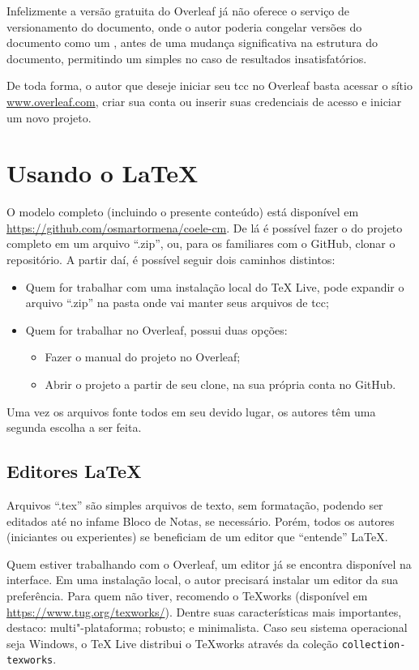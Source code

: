 Infelizmente a versão gratuita do Overleaf já não oferece o serviço de versionamento do documento, onde o autor poderia congelar versões do documento como um , antes de uma mudança significativa na estrutura do documento, permitindo um simples  no caso de resultados insatisfatórios.

De toda forma, o autor que deseje iniciar seu \ac{tcc} no Overleaf basta acessar o sítio \url{www.overleaf.com}, criar sua conta ou inserir suas credenciais de acesso e iniciar um novo projeto.

\section{Usando o \LaTeX}

O modelo completo (incluindo o presente conteúdo) está disponível em \url{https://github.com/osmartormena/coele-cm}. De lá é possível fazer o  do projeto completo em um arquivo \enquote{.zip}, ou, para os familiares com o GitHub, clonar o repositório. A partir daí, é possível seguir dois caminhos distintos:
\begin{itemize}
	\item Quem for trabalhar com uma instalação local do TeX Live, pode expandir o arquivo \enquote{.zip} na pasta onde vai manter seus arquivos de \ac{tcc};
	\item Quem for trabalhar no Overleaf, possui duas opções:
		\begin{itemize}
			\item Fazer o  manual do projeto no Overleaf;
			\item Abrir o projeto a partir de seu clone, na sua própria conta no GitHub.
		\end{itemize}
\end{itemize}

Uma vez os arquivos fonte todos em seu devido lugar, os autores têm uma segunda escolha a ser feita.

\subsection{Editores \LaTeX}

Arquivos \enquote{.tex} são simples arquivos de texto, sem formatação, podendo ser editados até no infame Bloco de Notas, se necessário. Porém, todos os autores (iniciantes ou experientes) se beneficiam de um editor que \enquote{entende} \LaTeX.

Quem estiver trabalhando com o Overleaf, um editor já se encontra disponível na interface. Em uma instalação local, o autor precisará instalar um editor da sua preferência. Para quem não tiver, recomendo o TeXworks (disponível em \url{https://www.tug.org/texworks/}). Dentre suas características mais importantes, destaco: multi"-plataforma; robusto; e minimalista. Caso seu sistema operacional seja Windows, o TeX Live distribui o TeXworks através da coleção \texttt{collection-texworks}.


